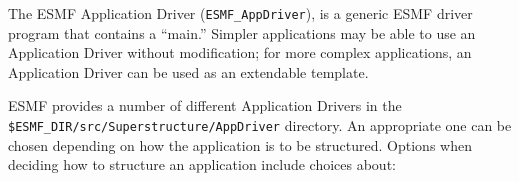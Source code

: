 %


The ESMF Application Driver ({\tt ESMF\_AppDriver}), is a generic ESMF 
driver program that contains a ``main.''  Simpler applications may be
able to use an Application Driver without modification; for more
complex applications, an Application Driver can be used as an extendable 
template.

ESMF provides a number of different Application Drivers in the 
{\tt \$ESMF\_DIR/src/Superstructure/AppDriver} directory.
An appropriate one can be chosen depending on how the application
is to be structured.  Options when deciding how to structure an 
application include choices about:

